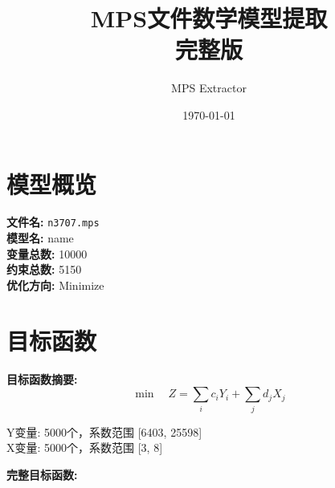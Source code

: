 \documentclass[a4paper,10pt]{article}
\title{MPS文件数学模型提取\\{\large 完整版}}
\author{MPS Extractor}
\date{\today}
\begin{document}
\maketitle
\tableofcontents
\newpage

\section{模型概览}

\textbf{文件名:} \texttt{n3707.mps} \\
\textbf{模型名:} name \\
\textbf{变量总数:} 10000 \\
\textbf{约束总数:} 5150 \\
\textbf{优化方向:} Minimize \\

\section{目标函数}

\textbf{目标函数摘要:}
\begin{equation}
\min \quad Z = \sum_{i} c_i Y_i + \sum_{j} d_j X_j
\end{equation}

Y变量: 5000个，系数范围 [6403, 25598] \\
X变量: 5000个，系数范围 [3, 8]

\textbf{完整目标函数:}
\end{document}
